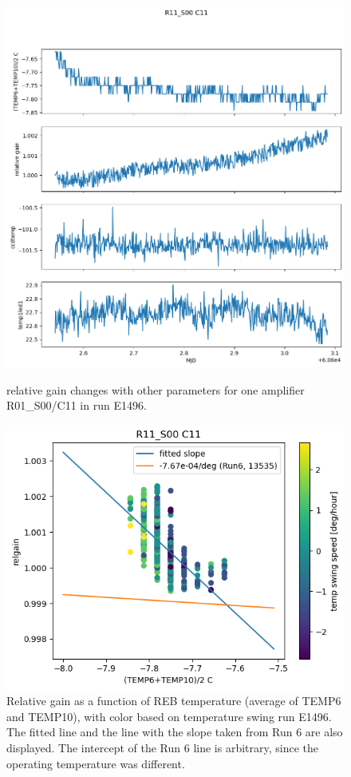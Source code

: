\begin{figure}[htbp]
\centering
\begin{minipage}{0.45\textwidth}
    \centering
    \includegraphics[width=\textwidth]{figures/gaintemp/E1496RelgainParametersTrending.png}
    \caption{relative gain changes with other parameters for one amplifier R01\_S00/C11 in run E1496.}
    \label{fig:relgainparamE1496}
\end{minipage}
\hfill
\begin{minipage}{0.45\textwidth}
    \centering
    \includegraphics[width=\textwidth]{figures/gaintemp/E1496RelgainDetail.png}
    \caption{Relative gain as a function of REB temperature (average of TEMP6 and TEMP10), with color based on temperature swing run E1496. The fitted line and the line with the slope taken from Run 6 are also displayed. The intercept of the Run 6 line is arbitrary, since the operating temperature was different.}
    \label{fig:gaintempE1496}
\end{minipage}
\end{figure}
